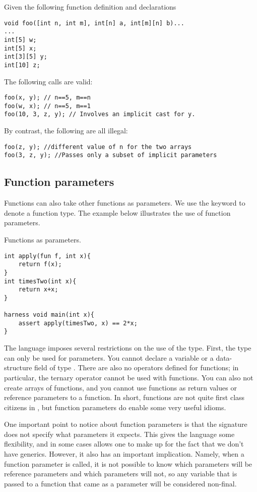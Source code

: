 \begin{Example}
Given the following function definition and declarations
\begin{lstlisting}
void foo([int n, int m], int[n] a, int[m][n] b)...
...
int[5] w;
int[5] x;
int[3][5] y;
int[10] z;
\end{lstlisting}
The following calls are valid:
\begin{lstlisting}
foo(x, y); // n==5, m==n
foo(w, x); // n==5, m==1
foo(10, 3, z, y); // Involves an implicit cast for y.
\end{lstlisting}

By contrast, the following are all illegal:
\begin{lstlisting}
foo(z, y); //different value of n for the two arrays
foo(3, z, y); //Passes only a subset of implicit parameters
\end{lstlisting}
\end{Example}



\subsection{Function parameters}
Functions can also take other functions as parameters. We use the keyword  to denote a function type. The example below illustrates the use of function parameters.
\begin{Example}
Functions as parameters.
\begin{lstlisting}
int apply(fun f, int x){
	return f(x);
}
int timesTwo(int x){
	return x+x;
}

harness void main(int x){
	assert apply(timesTwo, x) == 2*x;
}
\end{lstlisting}
\end{Example}

The language imposes several restrictions on the use of the  type. First, the type can only be used for parameters. You cannot declare a variable or a data-structure field of type . There are also no operators defined for functions; in particular, the ternary operator  cannot be used with functions. You can also not create arrays of functions, and you cannot use functions as return values or reference parameters to a function. In short, functions are not quite first class citizens in \Sk{}, but function parameters do enable some very useful idioms.

One important point to notice about function parameters is that the signature does not specify what parameters it expects. This gives the language some flexibility, and in some cases allows one to make up for the fact that we don't have generics. However, it also has an important implication. Namely, when a function parameter is called, it is not possible to know which parameters will be reference parameters and which parameters will not, so any variable that is passed to a function that came as a parameter will be considered non-final.


